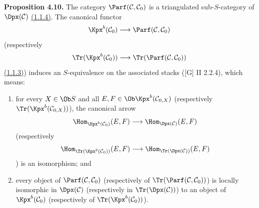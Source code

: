 \textbf{Proposition 4.10.} The category \(\Parf(\mathcal C,\mathcal C_0)\) is a triangulated sub-\(S\)-category of \(\Dpx(\mathcal C)\) \hyperlink{sga6.e01.para.1-1-4}{(1.1.4)}. The canonical functor
\[
  \Kpx^b(\mathcal C_0)\longrightarrow \Parf(\mathcal C,\mathcal C_0)
\]
(respectively
\[
  \Tr(\Kpx^b(\mathcal C_0))\longrightarrow \Tr(\Parf(\mathcal C,\mathcal C_0))
\]
\hyperlink{sga6.e01.para.1-1-3}{(1.1.3)}) induces an \(S\)-equivalence on the associated stacks ([G] II 2.2.4), which means:

\begin{enumerate}[label=(\roman*)]
\item for every \(X\in\Ob S\) and all \(E,F\in\Ob\Kpx^b(\mathcal C_{0,X})\) (respectively \(\Tr(\Kpx^b(\mathcal C_{0,X}))\)), the canonical arrow
\[
  \Hom_{\Kpx^b(\mathcal C_0)}(E,F)
  \longrightarrow
  \Hom_{\Dpx(\mathcal C)}(E,F)
\]
(respectively
\[
  \Hom_{\Tr(\Kpx^b(\mathcal C_0))}(E,F)
  \longrightarrow
  \Hom_{\Tr(\Dpx(\mathcal C))}(E,F)
\]) is an isomorphism; and
\item every object of \(\Parf(\mathcal C,\mathcal C_0)\) (respectively of \(\Tr(\Parf(\mathcal C,\mathcal C_0))\)) is locally isomorphic in \(\Dpx(\mathcal C)\) (respectively in \(\Tr(\Dpx(\mathcal C))\)) to an object of \(\Kpx^b(\mathcal C_0)\) (respectively of \(\Tr(\Kpx^b(\mathcal C_0))\)).
\end{enumerate}

